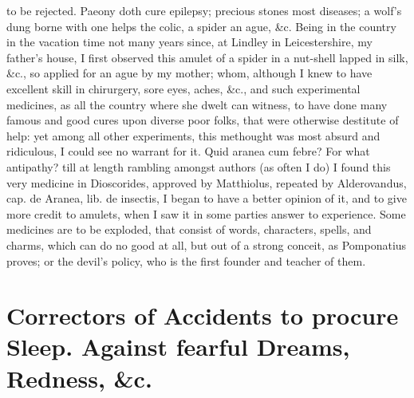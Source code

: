 to be rejected. Paeony doth cure epilepsy; precious stones most
diseases; a wolf's dung borne with one helps the colic, a
spider an ague, \&c. Being in the country in the vacation time not many
years since, at Lindley in Leicestershire, my father's house, I first
observed this amulet of a spider in a nut-shell lapped in silk, \&c., so
applied for an ague by my mother; whom, although I knew to have
excellent skill in chirurgery, sore eyes, aches, \&c., and such
experimental medicines, as all the country where she dwelt can witness,
to have done many famous and good cures upon diverse poor folks, that
were otherwise destitute of help: yet among all other experiments, this
methought was most absurd and ridiculous, I could see no warrant for
it. Quid aranea cum febre? For what antipathy? till at length rambling
amongst authors (as often I do) I found this very medicine in
Dioscorides, approved by Matthiolus, repeated by Alderovandus, cap. de
Aranea, lib. de insectis, I began to have a better opinion of it, and
to give more credit to amulets, when I saw it in some parties answer to
experience. Some medicines are to be exploded, that consist of words,
characters, spells, and charms, which can do no good at all, but out of
a strong conceit, as Pomponatius proves; or the devil's policy, who is
the first founder and teacher of them.

\section[Correctors for sleep]{Correctors of Accidents to procure Sleep. Against fearful Dreams, Redness, \&c.}

